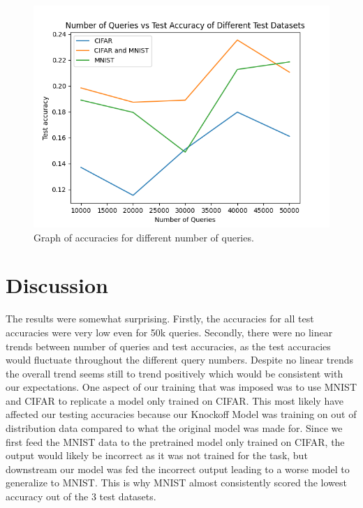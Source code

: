 \documentclass{article}
\begin{document}
\begin{figure}
    \includegraphics[width=\linewidth]{acc.png}
    \caption{Graph of accuracies for different number of queries.}
    \label{fig:graph1}
\end{figure}

\section{Discussion}
The results were somewhat surprising. Firstly, the accuracies for all test accuracies were very low even for 50k queries.
Secondly, there were no linear trends between number of queries and test accuracies, as the test accuracies would fluctuate throughout
the different query numbers. Despite no linear trends the overall trend seems still to trend positively which would be consistent with our expectations.
One aspect of our training that was imposed was to use MNIST and CIFAR to replicate a model only trained on CIFAR. This most likely have affected our testing accuracies 
because our Knockoff Model was training on out of distribution data compared to what the original model was made for. Since we first feed the MNIST data to the pretrained model 
only trained on CIFAR, the output would likely be incorrect as it was not trained for the task, but downstream our model was fed the incorrect output leading to a worse model to generalize 
to MNIST. This is why MNIST almost consistently scored the lowest accuracy out of the 3 test datasets.
\end{document}
